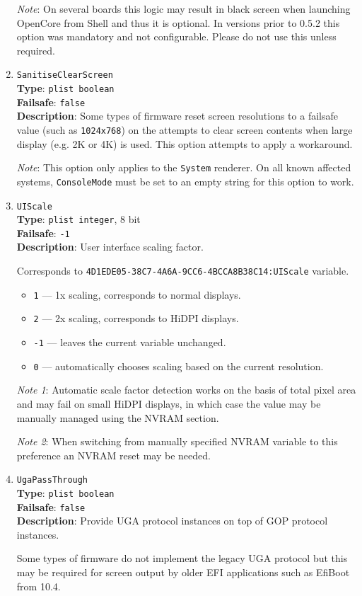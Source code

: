 \documentclass[]{article}
\providecommand{\tightlist}{%
  \setlength{\itemsep}{0pt}\setlength{\parskip}{0pt}}
\begin{document}
\begin{enumerate}
  \emph{Note}: On several boards this logic may result in black screen when launching
  OpenCore from Shell and thus it is optional. In versions prior to 0.5.2 this option
  was mandatory and not configurable. Please do not use this unless required.

\item
  \texttt{SanitiseClearScreen}\\
  \textbf{Type}: \texttt{plist\ boolean}\\
  \textbf{Failsafe}: \texttt{false}\\
  \textbf{Description}: Some types of firmware reset screen resolutions to a failsafe
  value (such as \texttt{1024x768}) on the attempts to clear screen contents
  when large display (e.g. 2K or 4K) is used. This option attempts to apply
  a workaround.

  \emph{Note}: This option only applies to the \texttt{System} renderer.
   On all known affected systems, \texttt{ConsoleMode} must be set to
   an empty string for this option to work.

\item
  \texttt{UIScale}\\
  \textbf{Type}: \texttt{plist\ integer}, 8 bit\\
  \textbf{Failsafe}: \texttt{-1}\\
  \textbf{Description}: User interface scaling factor.

  Corresponds to \texttt{4D1EDE05-38C7-4A6A-9CC6-4BCCA8B38C14:UIScale} variable.
  \begin{itemize}
    \tightlist
    \item \texttt{1} --- 1x scaling, corresponds to normal displays.
    \item \texttt{2} --- 2x scaling, corresponds to HiDPI displays.
    \item \texttt{-1} --- leaves the current variable unchanged.
    \item \texttt{0} --- automatically chooses scaling based on the current resolution.
  \end{itemize}

  \emph{Note 1}: Automatic scale factor detection works on the basis of total pixel area and may fail on small HiDPI displays,
  in which case the value may be manually managed using the NVRAM section.

  \emph{Note 2}: When switching from manually specified NVRAM variable to this preference an NVRAM reset may be needed.

\item
  \texttt{UgaPassThrough}\\
  \textbf{Type}: \texttt{plist\ boolean}\\
  \textbf{Failsafe}: \texttt{false}\\
  \textbf{Description}: Provide UGA protocol instances on top of GOP protocol instances.

  Some types of firmware do not implement the legacy UGA protocol but this may be required
  for screen output by older EFI applications such as EfiBoot from 10.4.

\end{enumerate}
\end{document}
